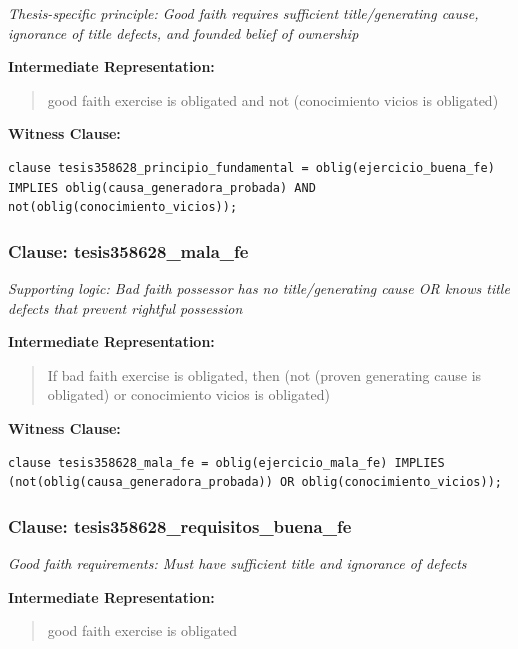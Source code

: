 \documentclass[11pt,a4paper]{article}
\begin{document}
\textit{Thesis-specific principle: Good faith requires sufficient title/generating cause, ignorance of title defects, and founded belief of ownership}

\textbf{Intermediate Representation:}

\begin{quote}
good faith exercise is obligated and not (conocimiento vicios is obligated)
\end{quote}

\textbf{Witness Clause:}

\begin{lstlisting}[style=witnessstyle, language=Witness]
clause tesis358628_principio_fundamental = oblig(ejercicio_buena_fe) IMPLIES oblig(causa_generadora_probada) AND not(oblig(conocimiento_vicios));
\end{lstlisting}

\subsubsection{Clause: tesis358628\_mala\_fe}

\textit{Supporting logic: Bad faith possessor has no title/generating cause OR knows title defects that prevent rightful possession}

\textbf{Intermediate Representation:}

\begin{quote}
If bad faith exercise is obligated, then (not (proven generating cause is obligated) or conocimiento vicios is obligated)
\end{quote}

\textbf{Witness Clause:}

\begin{lstlisting}[style=witnessstyle, language=Witness]
clause tesis358628_mala_fe = oblig(ejercicio_mala_fe) IMPLIES (not(oblig(causa_generadora_probada)) OR oblig(conocimiento_vicios));
\end{lstlisting}

\subsubsection{Clause: tesis358628\_requisitos\_buena\_fe}

\textit{Good faith requirements: Must have sufficient title and ignorance of defects}

\textbf{Intermediate Representation:}

\begin{quote}
good faith exercise is obligated
\end{quote}
\end{document}
